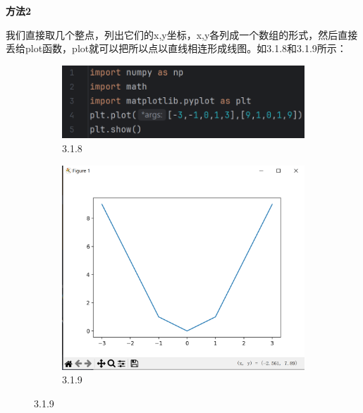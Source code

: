 \documentclass[12pt]{article}
\begin{document}
\textbf{\large 方法2}

我们直接取几个整点，列出它们的x,y坐标，x,y各列成一个数组的形式，然后直接丢给plot函数，plot就可以把所以点以直线相连形成线图。如3.1.8和3.1.9所示：

\begin{figure}[H]
    \centering
    \begin{subfigure}[b]{0.45\textwidth}
        \includegraphics[width=1.2\textwidth,height=0.45\textwidth]{线图方法2 2.png}
        \caption{3.1.8}
        \label{fig:enter-label-1}
    \end{subfigure}
    \hfill        
    \begin{subfigure}[b]{0.45\textwidth}
        \includegraphics[width=\textwidth]{线图方法2 Pic.png}
        \caption{3.1.9}
        \label{fig:enter-label-2}
    \end{subfigure}
\end{figure}
\end{document}
